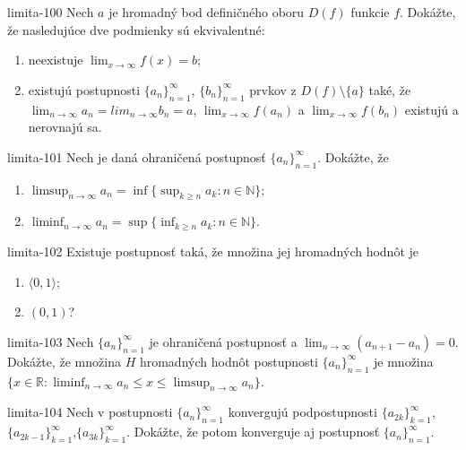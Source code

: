 \begin{defproblem}{limita-100}
Nech $a$ je hromadný bod definičného oboru $D(f)$ funkcie $f$. Dokážte, že nasledujúce dve podmienky sú ekvivalentné:
\begin{enumerate}
\item neexistuje $\lim_{x \rightarrow \infty} f(x)=b$;
\item existujú postupnosti ${\{a_n\}}_{n=1}^\infty$, ${\{b_n\}}_{n=1}^\infty$ prvkov z $D(f) \setminus \{a \}$ také, že $\lim_{n \rightarrow \infty} a_n=lim_{n \rightarrow \infty} b_n=a$, $\lim_{x \rightarrow \infty} f(a_n)$ a $\lim_{x \rightarrow \infty} f(b_n)$ existujú a nerovnajú sa.
\end{enumerate}
\end{defproblem}

\begin{defproblem}{limita-101}
Nech je daná ohraničená postupnosť ${\{a_n\}}_{n=1}^\infty$. Dokážte, že 
\begin{multicols}{2}
\begin{enumerate}
    \item $\limsup_{n \rightarrow \infty} a_n=\inf \{\sup_{k \geq n} a_k: n \in \mathbb{N}\}$;
    \item $\liminf_{n \rightarrow \infty} a_n= \sup \{\inf_{k \geq n} a_k: n \in \mathbb{N}\}$.
\end{enumerate}
\end{multicols}
\end{defproblem}

\begin{defproblem}{limita-102}
Existuje postupnosť taká, že množina jej hromadných hodnôt je
\begin{enumerate}
\item $\langle 0,1 \rangle$;
\item $(0,1)$?
\end{enumerate}
\end{defproblem}

\begin{defproblem}{limita-103}
Nech ${\{a_n\}}_{n=1}^\infty$ je ohraničená postupnosť a $\lim_{n \rightarrow \infty} (a_{n+1}-a_n)=0$. Dokážte, že množina $H$ hromadných hodnôt postupnosti ${\{a_n\}}_{n=1}^\infty$ je množina $\{x \in \mathbb{R}: \liminf_{n \rightarrow \infty} a_n \leq x \leq \limsup_{n \rightarrow \infty} a_n\}$.
\end{defproblem}

\begin{defproblem}{limita-104}
Nech v postupnosti ${\{a_n\}}_{n=1}^\infty$ konvergujú podpostupnosti ${\{a_{2k}\}}_{k=1}^\infty$,${\{a_{2k-1}\}}_{k=1}^\infty$,${\{a_{3k}\}}_{k=1}^\infty$. Dokážte, že potom konverguje aj postupnosť ${\{a_n\}}_{n=1}^\infty$.
\end{defproblem}

